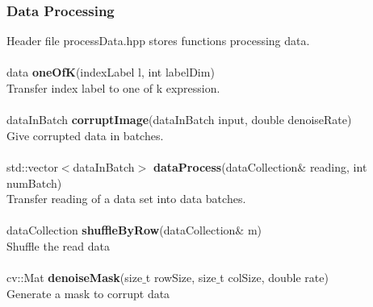 \documentclass[12pt]{article}
\begin{document}
\subsubsection{Data Processing}
Header file processData.hpp stores functions processing data.\\
\\
data \textbf{oneOfK}(indexLabel l, int labelDim)\\
Transfer index label to one of k expression.\\
\\
dataInBatch \textbf{corruptImage}(dataInBatch input, double denoiseRate)\\
Give corrupted data in batches.\\
\\
std::vector$<$dataInBatch$>$ \textbf{dataProcess}(dataCollection$\&$ reading, int numBatch)\\
Transfer reading of a data set into data batches.\\
\\
dataCollection \textbf{shuffleByRow}(dataCollection$\&$ m)\\
Shuffle the read data\\
\\
cv::Mat \textbf{denoiseMask}(size$\_$t rowSize, size$\_$t colSize, double rate)\\
Generate a mask to corrupt data
\end{document}
